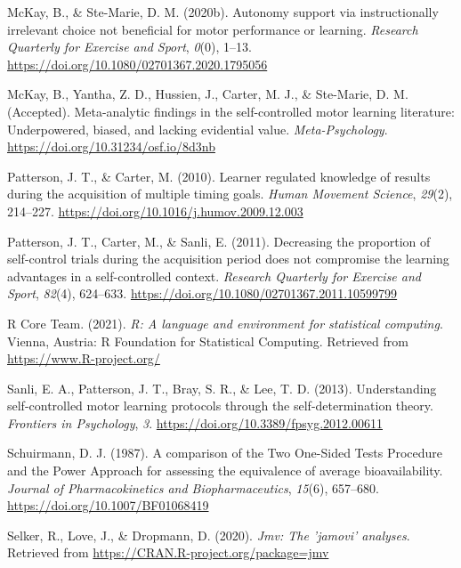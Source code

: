 \documentclass[
  english,
  man, donotrepeattitle,floatsintext]{apa7}
\newlength{\cslhangindent}
\newlength{\cslentryspacingunit} %
\newenvironment{CSLReferences}[2] %
 {%
  \setlength{\parindent}{0pt}
  \ifodd #1
  \let\oldpar\par
  \def\par{\hangindent=\cslhangindent\oldpar}
  \fi
  \setlength{\parskip}{#2\cslentryspacingunit}
 }%
 {}
\begin{document}
\begin{CSLReferences}{1}{0}
\leavevmode{}%
McKay, B., \& Ste-Marie, D. M. (2020b). Autonomy support via instructionally irrelevant choice not beneficial for motor performance or learning. \emph{Research Quarterly for Exercise and Sport}, \emph{0}(0), 1--13. \url{https://doi.org/10.1080/02701367.2020.1795056}

\leavevmode{}%
McKay, B., Yantha, Z. D., Hussien, J., Carter, M. J., \& Ste-Marie, D. M. (Accepted). Meta-analytic findings in the self-controlled motor learning literature: Underpowered, biased, and lacking evidential value. \emph{Meta-Psychology}. \url{https://doi.org/10.31234/osf.io/8d3nb}

\leavevmode{}%
Patterson, J. T., \& Carter, M. (2010). Learner regulated knowledge of results during the acquisition of multiple timing goals. \emph{Human Movement Science}, \emph{29}(2), 214--227. \url{https://doi.org/10.1016/j.humov.2009.12.003}

\leavevmode{}%
Patterson, J. T., Carter, M., \& Sanli, E. (2011). Decreasing the proportion of self-control trials during the acquisition period does not compromise the learning advantages in a self-controlled context. \emph{Research Quarterly for Exercise and Sport}, \emph{82}(4), 624--633. \url{https://doi.org/10.1080/02701367.2011.10599799}

\leavevmode{}%
R Core Team. (2021). \emph{R: A language and environment for statistical computing}. Vienna, Austria: R Foundation for Statistical Computing. Retrieved from \url{https://www.R-project.org/}

\leavevmode{}%
Sanli, E. A., Patterson, J. T., Bray, S. R., \& Lee, T. D. (2013). Understanding self-controlled motor learning protocols through the self-determination theory. \emph{Frontiers in Psychology}, \emph{3}. \url{https://doi.org/10.3389/fpsyg.2012.00611}

\leavevmode{}%
Schuirmann, D. J. (1987). A comparison of the Two One-Sided Tests Procedure and the Power Approach for assessing the equivalence of average bioavailability. \emph{Journal of Pharmacokinetics and Biopharmaceutics}, \emph{15}(6), 657--680. \url{https://doi.org/10.1007/BF01068419}

\leavevmode{}%
Selker, R., Love, J., \& Dropmann, D. (2020). \emph{Jmv: The 'jamovi' analyses}. Retrieved from \url{https://CRAN.R-project.org/package=jmv}


\end{CSLReferences}
\end{document}
